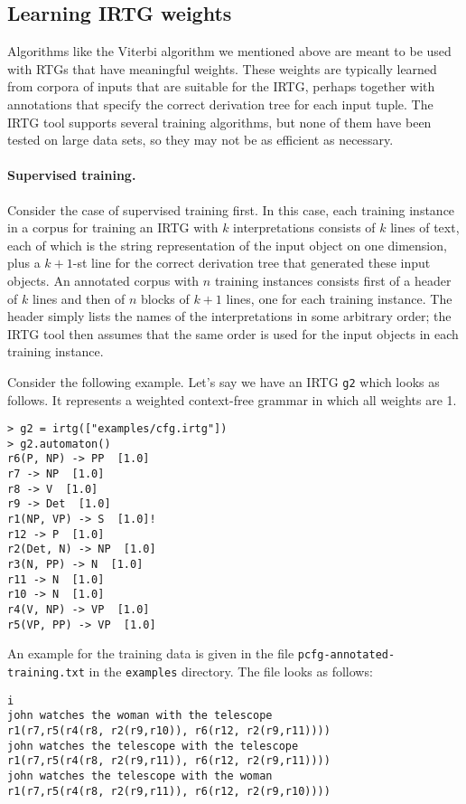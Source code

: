 \documentclass[11pt]{article}
\begin{document}
\subsection{Learning IRTG weights}

Algorithms like the Viterbi algorithm we mentioned above are meant to
be used with RTGs that have meaningful weights.  These weights are
typically learned from corpora of inputs that are suitable for the
IRTG, perhaps together with annotations that specify the correct
derivation tree for each input tuple.  The IRTG tool supports several
training algorithms, but none of them have been tested on large data
sets, so they may not be as efficient as necessary.

\paragraph{Supervised training.}
Consider the case of supervised training first.  In this case, each
training instance in a corpus for training an IRTG with $k$
interpretations consists of $k$ lines of text, each of which is the
string representation of the input object on one dimension, plus a
$k+1$-st line for the correct derivation tree that generated these
input objects.  An annotated corpus with $n$ training instances
consists first of a header of $k$ lines and then of $n$ blocks of
$k+1$ lines, one for each training instance.  The header simply lists
the names of the interpretations in some arbitrary order; the IRTG
tool then assumes that the same order is used for the input objects in
each training instance.

Consider the following example. Let's say we have an IRTG \verb?g2?
which looks as follows. It represents a weighted context-free grammar
in which all weights are 1.

\begin{verbatim}
> g2 = irtg(["examples/cfg.irtg"])
> g2.automaton()
r6(P, NP) -> PP  [1.0]
r7 -> NP  [1.0]
r8 -> V  [1.0]
r9 -> Det  [1.0]
r1(NP, VP) -> S  [1.0]!
r12 -> P  [1.0]
r2(Det, N) -> NP  [1.0]
r3(N, PP) -> N  [1.0]
r11 -> N  [1.0]
r10 -> N  [1.0]
r4(V, NP) -> VP  [1.0]
r5(VP, PP) -> VP  [1.0]
\end{verbatim}

An example for the training data is given in the file
\verb?pcfg-annotated-training.txt? in the \verb?examples?
directory. The file looks as follows:

\begin{verbatim}
i
john watches the woman with the telescope
r1(r7,r5(r4(r8, r2(r9,r10)), r6(r12, r2(r9,r11))))
john watches the telescope with the telescope
r1(r7,r5(r4(r8, r2(r9,r11)), r6(r12, r2(r9,r11))))
john watches the telescope with the woman
r1(r7,r5(r4(r8, r2(r9,r11)), r6(r12, r2(r9,r10))))
\end{verbatim}
\end{document}
